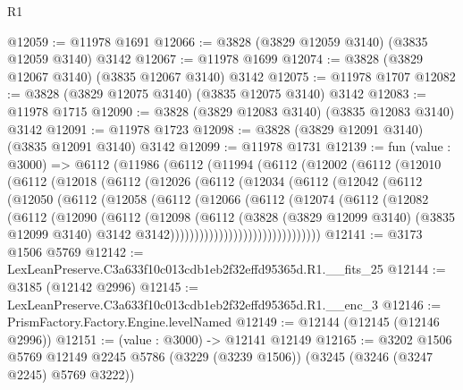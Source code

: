 \begin{lexlean}{R1}
\begin{coremodule}
@12059 := @11978 @1691
@12066 := @3828 (@3829 @12059 @3140) (@3835 @12059 @3140) @3142
@12067 := @11978 @1699
@12074 := @3828 (@3829 @12067 @3140) (@3835 @12067 @3140) @3142
@12075 := @11978 @1707
@12082 := @3828 (@3829 @12075 @3140) (@3835 @12075 @3140) @3142
@12083 := @11978 @1715
@12090 := @3828 (@3829 @12083 @3140) (@3835 @12083 @3140) @3142
@12091 := @11978 @1723
@12098 := @3828 (@3829 @12091 @3140) (@3835 @12091 @3140) @3142
@12099 := @11978 @1731
@12139 := fun (value : @3000) =>
  @6112
    (@11986
      (@6112
        (@11994
          (@6112
            (@12002
              (@6112
                (@12010
                  (@6112
                    (@12018
                      (@6112
                        (@12026
                          (@6112
                            (@12034
                              (@6112
                                (@12042
                                  (@6112
                                    (@12050
                                      (@6112
                                        (@12058
                                          (@6112
                                            (@12066
                                              (@6112
                                                (@12074
                                                  (@6112
                                                    (@12082
                                                      (@6112
                                                        (@12090
                                                          (@6112
                                                            (@12098
                                                              (@6112
                                                                (@3828
                                                                  (@3829 @12099 @3140)
                                                                  (@3835 @12099 @3140)
                                                                  @3142
                                                                  @3142)))))))))))))))))))))))))))))))
@12141 := @3173 @1506 @5769
@12142 := LexLeanPreserve.C3a633f10c013cdb1eb2f32effd95365d.R1.__fits_25
@12144 := @3185 (@12142 @2996)
@12145 := LexLeanPreserve.C3a633f10c013cdb1eb2f32effd95365d.R1.__enc_3
@12146 := PrismFactory.Factory.Engine.levelNamed
@12149 := @12144 (@12145 (@12146 @2996))
@12151 := (value : @3000) -> @12141 @12149
@12165 := @3202
    @1506
    @5769
    @12149
    @2245
    @5786
    (@3229 (@3239 @1506))
    (@3245 (@3246 (@3247 @2245) @5769 @3222))

\end{coremodule}
\end{lexlean}
